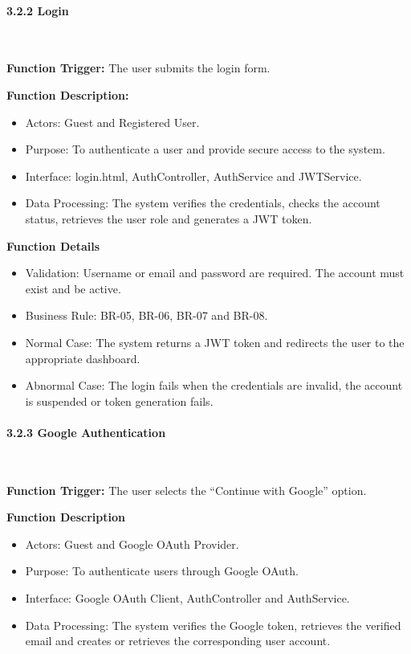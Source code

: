 \paragraph*{3.2.2 Login}\leavevmode\\[-0.5em]
\label{par:login}

\textbf{Function Trigger:} The user submits the login form.

\textbf{Function Description:}
\begin{itemize}[leftmargin=1.5em, nosep]
    \item Actors: Guest and Registered User.
    \item Purpose: To authenticate a user and provide secure access to the system.
    \item Interface: login.html, AuthController, AuthService and JWTService.
    \item Data Processing: The system verifies the credentials, checks the account status, retrieves the user role and generates a JWT token.
\end{itemize}

\textbf{Function Details}
\begin{itemize}[leftmargin=1.5em, nosep]
    \item Validation: Username or email and password are required. The account must exist and be active.
    \item Business Rule: BR-05, BR-06, BR-07 and BR-08.
    \item Normal Case: The system returns a JWT token and redirects the user to the appropriate dashboard.
    \item Abnormal Case: The login fails when the credentials are invalid, the account is suspended or token generation fails.
\end{itemize}

\paragraph*{3.2.3 Google Authentication}\leavevmode\\[-0.5em]
\label{par:google-authentication}

\textbf{Function Trigger:} The user selects the ``Continue with Google'' option.

\textbf{Function Description}
\begin{itemize}[leftmargin=1.5em, nosep]
    \item Actors: Guest and Google OAuth Provider.
    \item Purpose: To authenticate users through Google OAuth.
    \item Interface: Google OAuth Client, AuthController and AuthService.
    \item Data Processing: The system verifies the Google token, retrieves the verified email and creates or retrieves the corresponding user account.
\end{itemize}

